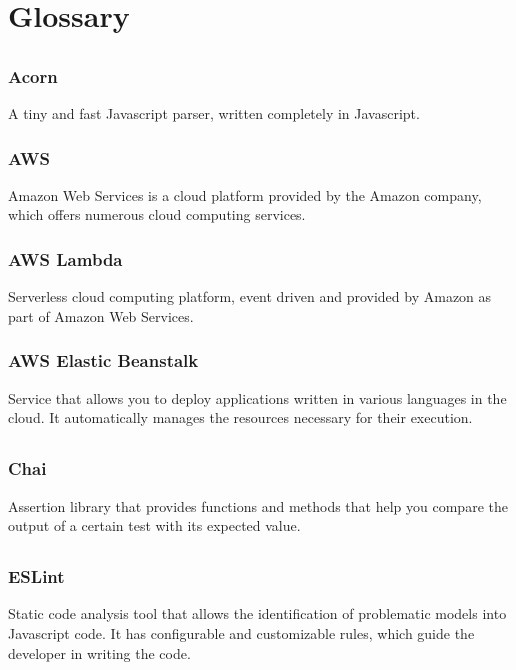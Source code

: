 \section{Glossary}
	\subsection*{}
		\subsubsection*{Acorn}
			A tiny and fast Javascript parser, written completely in Javascript. 
		\subsubsection*{AWS}
			Amazon Web Services is a cloud platform provided by the Amazon company, which offers numerous cloud computing services.
		\subsubsection*{AWS Lambda}
			Serverless cloud computing platform, event driven and provided by Amazon as part of Amazon Web Services.
			
		\subsubsection*{AWS Elastic Beanstalk}
			Service that allows you to deploy applications written in various languages in the cloud. It automatically manages the resources necessary for their execution.
			
	\subsection*{}
		\subsubsection*{Chai}
			Assertion library that provides functions and methods that help you compare the output of a certain test with its expected value.
			
	\subsection*{}
		\subsubsection*{ESLint}
			Static code analysis tool that allows the identification of problematic models into Javascript code. It has configurable and customizable rules, which guide the developer in writing the code.
